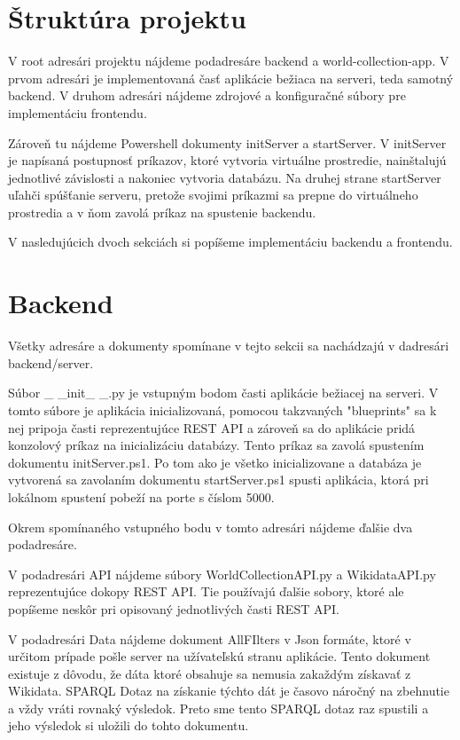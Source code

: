 \section{Štruktúra projektu}
V root adresári projektu nájdeme podadresáre backend a world-collection-app. V prvom adresári je implementovaná časť aplikácie bežiaca na serveri, teda samotný backend. 
V druhom adresári nájdeme zdrojové a konfiguračné súbory pre implementáciu frontendu. 

Zároveň tu nájdeme Powershell dokumenty initServer a startServer. V initServer je napísaná postupnosť príkazov, ktoré vytvoria virtuálne prostredie, nainštalujú jednotlivé závislosti a nakoniec vytvoria databázu. 
Na druhej strane startServer uľahči spúšťanie serveru, pretože svojimi príkazmi sa prepne do virtuálneho prostredia a v ňom zavolá príkaz na spustenie backendu. 

V nasledujúcich dvoch sekciách si popíšeme implementáciu backendu a frontendu. 

\section{Backend}
Všetky adresáre a dokumenty spomínane v tejto sekcii sa nachádzajú v dadresári backend/server. 

Súbor \_ \_init\_ \_.py je vstupným bodom časti aplikácie bežiacej na serveri. V tomto súbore je aplikácia inicializovaná, pomocou takzvaných "blueprints" sa k nej pripoja časti reprezentujúce REST API a 
zároveň sa do aplikácie pridá konzolový príkaz na inicializáciu databázy. Tento príkaz sa zavolá spustením dokumentu initServer.ps1. Po tom ako je všetko inicializovane a databáza je vytvorená sa zavolaním dokumentu startServer.ps1 spusti aplikácia, ktorá pri lokálnom spustení pobeží na porte s číslom 5000. 

Okrem spomínaného vstupného bodu v tomto adresári nájdeme ďalšie dva podadresáre. 

V podadresári API nájdeme súbory WorldCollectionAPI.py a WikidataAPI.py reprezentujúce dokopy REST API. Tie používajú ďalšie sobory, ktoré ale popíšeme neskôr pri
opisovaný jednotlivých časti REST API. 

V podadresári Data nájdeme dokument AllFIlters v Json formáte, ktoré v určitom prípade pošle server na užívateľskú stranu aplikácie. 
Tento dokument existuje z dôvodu, že dáta ktoré obsahuje sa nemusia zakaždým získavať z Wikidata. SPARQL Dotaz na získanie týchto dát je časovo náročný na zbehnutie a 
vždy vráti rovnaký výsledok. Preto sme tento SPARQL dotaz raz spustili a jeho výsledok si uložili do tohto dokumentu. 

